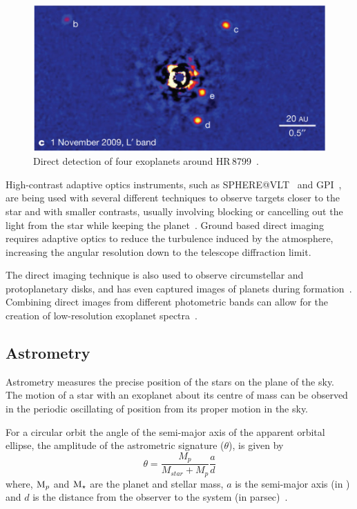 \begin{figure}
    \centering
    \includegraphics[width=0.5\linewidth]{./figures/introduction/DirectImaging_HR8799_MaroisEtAl2010}
    \caption{Direct detection of four exoplanets around HR\,8799~\citep{marois_images_2010}.}
    \label{fig:directimaging}
\end{figure}

High-contrast adaptive optics instruments, such as SPHERE@VLT~\citep{beuzit_sphere_2008} and GPI~\citep{macintosh_gemini_2008}, are being used with several different techniques to observe targets closer to the star and with smaller contrasts, usually involving blocking or cancelling out the light from the star while keeping the planet~\citep[e.g.][]{marois_direct_2005, mawet_annular_2005, schmid_zimpol_2005, sirbu_prospects_2017, sirbu_techniques_2017, wang_observing_2017}.
Ground based direct imaging requires adaptive optics to reduce the turbulence induced by the atmosphere, increasing the angular resolution down to the telescope diffraction limit.

The direct imaging technique is also used to observe circumstellar and protoplanetary disks, and has even captured images of planets during formation~\citep[e.g.][]{sallum_accreting_2015}.
Combining direct images from different photometric bands can allow for the creation of low-resolution exoplanet spectra~\citep[e.g.][]{kuzuhara_direct_2013, zurlo_new_2015}.


\subsection{Astrometry}

\label{sub:astrometry}
Astrometry measures the precise position of the stars on the plane of the sky.
The motion of a star with an exoplanet about its centre of mass can be observed in the periodic oscillating of position from its proper motion in the sky.

For a circular orbit the angle of the semi-major axis of the apparent orbital ellipse, the amplitude of the astrometric signature ($\theta$), is given by
\begin{equation}
\theta = \frac{M_{p}}{M_{star} + M_{p}} \frac{a}{d}
\end{equation}
where, $\textrm{M}_{p}$ and $\textrm{M}_{\star}$ are the planet and stellar mass, $a$ is the semi-major axis (in \AU) and $d$ is the distance from the observer to the system (in parsec)~\citep{perryman_exoplanet_2011}.

